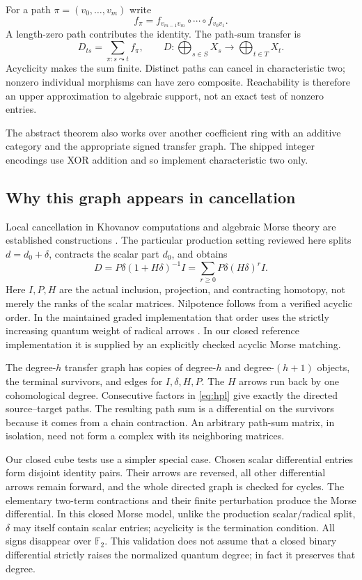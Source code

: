 \documentclass[11pt,letterpaper]{article}
\theoremstyle{definition}\newtheorem{definition}[theorem]{Definition}
\theoremstyle{remark}\newtheorem{remark}[theorem]{Remark}
\newcommand{\F}{\mathbb F_2}
\begin{document}
For a path $\pi=(v_0,\ldots,v_m)$ write
\[
 f_\pi=f_{v_{m-1}v_m}\circ\cdots\circ f_{v_0v_1}.
\]
A length-zero path contributes the identity. The path-sum transfer is
\begin{equation}
D_{ts}=\sum_{\pi:s\leadsto t}f_\pi,
\qquad D:\bigoplus_{s\in S}X_s\longrightarrow\bigoplus_{t\in T}X_t.
\label{eq:pathsum}
\end{equation}
Acyclicity makes the sum finite. Distinct paths can cancel in characteristic
two; nonzero individual morphisms can have zero composite. Reachability is
therefore an upper approximation to algebraic support, not an exact test of
nonzero entries.

The abstract theorem also works over another coefficient ring with an
additive category and the appropriate signed transfer graph. The shipped
integer encodings use XOR addition and so implement characteristic two only.

\subsection{Why this graph appears in cancellation}
Local cancellation in Khovanov computations and algebraic Morse theory are
established constructions \cite{barnatan2007,kozlov2005,skoldberg2018}.
The particular production setting reviewed here splits $d=d_0+\delta$,
contracts the scalar part $d_0$, and obtains
\begin{equation}
D=P\delta(1+H\delta)^{-1}I
 =\sum_{r\geq0}P\delta(H\delta)^rI.
\label{eq:hpl}
\end{equation}
Here $I,P,H$ are the actual inclusion, projection, and contracting homotopy,
not merely the ranks of the scalar matrices. Nilpotence follows from a
verified acyclic order. In the maintained graded implementation that order
uses the strictly increasing quantum weight of radical arrows
\cite{repograded}. In our closed reference implementation it is supplied by
an explicitly checked acyclic Morse matching.

The degree-$h$ transfer graph has copies of degree-$h$ and degree-$(h+1)$
objects, the terminal survivors, and edges for $I,\delta,H,P$.
The $H$ arrows run back by one cohomological degree. Consecutive factors in
\eqref{eq:hpl} give exactly the directed source--target paths. The resulting
path sum is a differential on the survivors because it comes from a chain
contraction. An arbitrary path-sum matrix, in isolation, need not form a
complex with its neighboring matrices.

Our closed cube tests use a simpler special case. Chosen scalar differential
entries form disjoint identity pairs. Their arrows are reversed, all other
differential arrows remain forward, and the whole directed graph is checked
for cycles. The elementary two-term contractions and their finite perturbation
produce the Morse differential. In this closed Morse model, unlike the
production scalar/radical split, $\delta$ may itself contain scalar entries;
acyclicity is the termination condition. All signs disappear over $\F$. This
validation does not assume that a closed binary differential strictly raises
the normalized quantum degree; in fact it preserves that degree.
\end{document}
